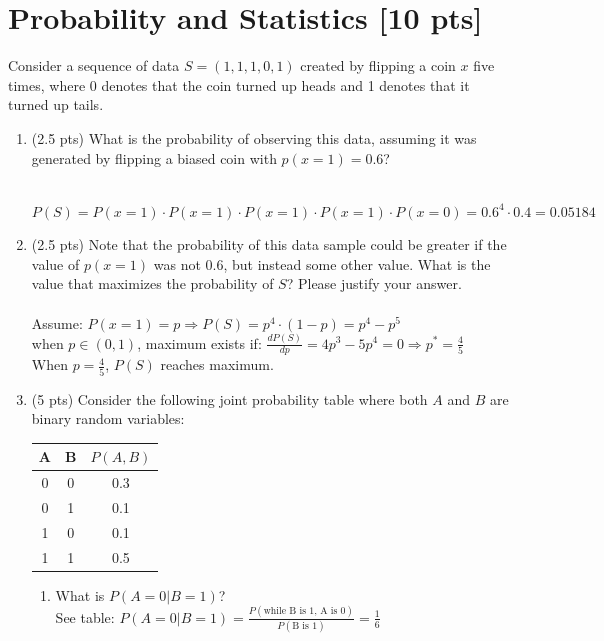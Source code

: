 \documentclass[a4paper]{article}
\theoremstyle{definition}
\newenvironment{soln}{
	\leavevmode\color{blue}\ignorespaces
}{}
\begin{document}
	
	
	
	\section{Probability and Statistics [10 pts]}
	Consider a sequence of data $S = (1, 1, 1, 0, 1)$ created by flipping a coin $x$ five times, where 0 denotes that the coin turned up heads and 1 denotes that it turned up tails.
	\begin{enumerate}
		\item 	(2.5 pts) What is the probability of observing this data, assuming it was generated by flipping a biased coin with $p(x=1) = 0.6$?
		
		\begin{soln}
		\\
		$P(S) = P(x=1) \cdot P(x=1) \cdot P(x=1) \cdot P(x=1) \cdot P(x=0) = 0.6^4 \cdot 0.4 = 0.05184$
		\end{soln}
		
		\item 	(2.5 pts) Note that the probability of this data sample could be greater if the value of $p(x = 1)$ was not $0.6$, but instead some other value. What is the value that maximizes the probability of $S$? Please justify your answer.\\
		\begin{soln}\\
		Assume: $P(x=1) = p \Rightarrow P(S) = p^4 \cdot (1-p) = p^4 - p^5$\\
		when $p \in (0,1)$, maximum exists if: $\frac{dP(S)}{dp} = 4p^3 - 5p^4 = 0 \Rightarrow p^* = \frac{4}{5}$\\
		When $p = \frac{4}{5}$, $P(S)$ reaches maximum.
		\end{soln}
		
		\item 	(5 pts) Consider the following joint probability table where both $A$ and $B$ are binary random variables: 
		\begin{table}[htb]
			\centering
			\begin{tabular}{ccc}\hline
				A & B & $P(A, B)$  \\\hline
				0 & 0 & 0.3 \\
				0 & 1 & 0.1 \\
				1 & 0 & 0.1 \\
				1 & 1 & 0.5 \\\hline
			\end{tabular}
		\end{table}
		\begin{enumerate}
			\item 	What is $P(A = 0 | B = 1)$?\\
			 \begin{soln}  See table: $P(A=0 | B=1) =\frac{P(\text{while B is 1, A is 0})}{P(\text{B is 1})}= \frac{1}{6}$ \end{soln}
			 

\end{enumerate}
\end{enumerate}
\end{document}
